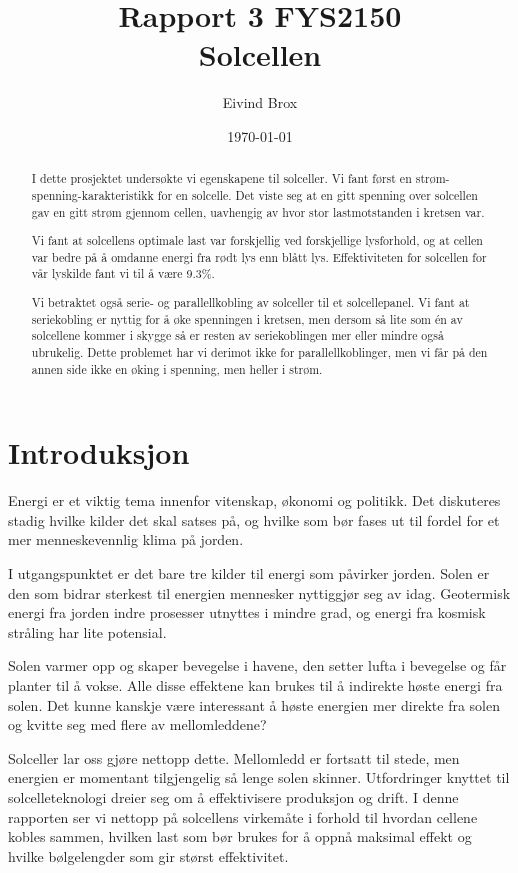 \documentclass[a4paper,11pt, twocolumn]{article}
\title{Rapport 3 FYS2150\\Solcellen}
\author{Eivind Brox}
\date{\today}
\begin{document}
\maketitle

\begin{abstract}
I dette prosjektet undersøkte vi egenskapene til solceller. Vi fant først en strøm-spenning-karakteristikk for en solcelle. Det viste seg at en gitt spenning over solcellen gav en gitt strøm gjennom cellen, uavhengig av hvor stor lastmotstanden i kretsen var. 

Vi fant at solcellens optimale last var forskjellig ved forskjellige lysforhold, og at cellen var bedre på å omdanne energi fra rødt lys enn blått lys. Effektiviteten for solcellen for vår lyskilde fant vi til å være 9.3\%.

Vi betraktet også serie- og parallellkobling av solceller til et solcellepanel. Vi fant at seriekobling er nyttig for å øke spenningen i kretsen, men dersom så lite som \'en av solcellene kommer i skygge så er resten av seriekoblingen mer eller mindre også ubrukelig. Dette problemet har vi derimot ikke for parallellkoblinger, men vi får på den annen side ikke en øking i spenning, men heller i strøm.
\end{abstract}

\section{Introduksjon}
Energi er et viktig tema innenfor vitenskap, økonomi og politikk. Det diskuteres stadig hvilke kilder det skal satses på, og hvilke som bør fases ut til fordel for et mer menneskevennlig klima på jorden. 

I utgangspunktet er det bare tre kilder til energi som påvirker jorden. Solen er den som bidrar sterkest til energien mennesker nyttiggjør seg av idag. Geotermisk energi fra jorden indre prosesser utnyttes i mindre grad, og energi fra kosmisk stråling har lite potensial.

Solen varmer opp og skaper bevegelse i havene, den setter lufta i bevegelse og får planter til å vokse. Alle disse effektene kan brukes til å indirekte høste energi fra solen. Det kunne kanskje være interessant å høste energien mer direkte fra solen og kvitte seg med flere av mellomleddene?

Solceller lar oss gjøre nettopp dette. Mellomledd er fortsatt til stede, men energien er momentant tilgjengelig så lenge solen skinner. Utfordringer knyttet til solcelleteknologi dreier seg om å effektivisere produksjon og drift. I denne rapporten ser vi nettopp på solcellens virkemåte i forhold til hvordan cellene kobles sammen, hvilken last som bør brukes for å oppnå maksimal effekt og hvilke bølgelengder som gir størst effektivitet.   
\end{document}

